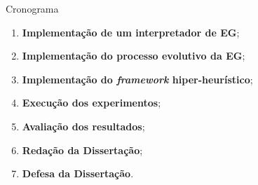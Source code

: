 \begin{frame}[allowframebreaks]{Cronograma}
	
	\begin{enumerate}
		
		
		\item \textbf{Implementação de um interpretador de EG};
		
		\item \textbf{Implementação do processo evolutivo da EG};
		
		
		\item \textbf{Implementação do \textit{framework} hiper-heurístico};
		
		\item \textbf{Execução dos experimentos};
		
		\item \textbf{Avaliação dos resultados};
		
		\item \textbf{Redação da Dissertação};
		\item \textbf{Defesa da Dissertação}.
	\end{enumerate}	
	

\end{frame}
